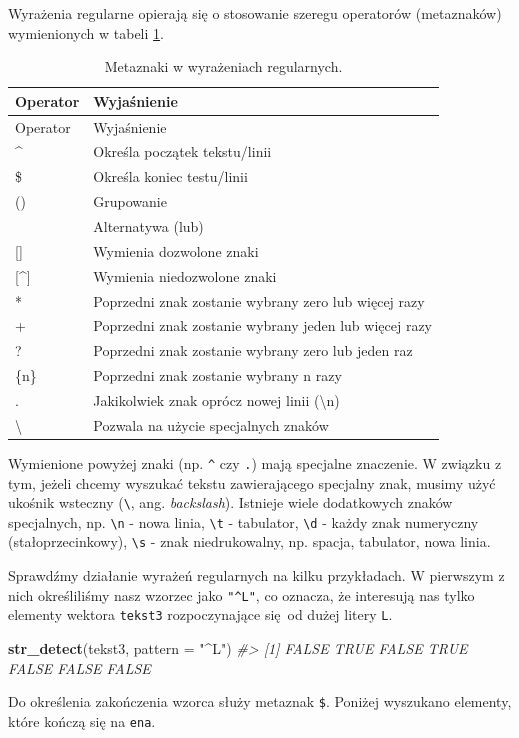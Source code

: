 \documentclass[paper=6in:9in,pagesize=pdftex,headinclude=on,footinclude=on,10pt]{scrbook}
\newenvironment{Shaded}{\begin{snugshade}}{\end{snugshade}}
\newcommand{\CommentTok}[1]{\textcolor[rgb]{0.56,0.35,0.01}{\textit{#1}}}
\newcommand{\DataTypeTok}[1]{\textcolor[rgb]{0.13,0.29,0.53}{#1}}
\newcommand{\KeywordTok}[1]{\textcolor[rgb]{0.13,0.29,0.53}{\textbf{#1}}}
\newcommand{\NormalTok}[1]{#1}
\newcommand{\StringTok}[1]{\textcolor[rgb]{0.31,0.60,0.02}{#1}}
\begin{document}
Wyrażenia regularne opierają się o stosowanie szeregu operatorów (metaznaków) wymienionych w tabeli \ref{tab:regexoperators}.

\begin{longtable}[]{@{}ll@{}}
\caption{\label{tab:regexoperators}Metaznaki w wyrażeniach regularnych.}\tabularnewline
\toprule
Operator & Wyjaśnienie\tabularnewline
\midrule
\endfirsthead
\toprule
Operator & Wyjaśnienie\tabularnewline
\midrule
\endhead
\^{} & Określa początek tekstu/linii\tabularnewline
\$ & Określa koniec testu/linii\tabularnewline
() & Grupowanie\tabularnewline
\textbar{} & Alternatywa (lub)\tabularnewline
{[}{]} & Wymienia dozwolone znaki\tabularnewline
{[}\^{}{]} & Wymienia niedozwolone znaki\tabularnewline
* & Poprzedni znak zostanie wybrany zero lub więcej razy\tabularnewline
+ & Poprzedni znak zostanie wybrany jeden lub więcej razy\tabularnewline
? & Poprzedni znak zostanie wybrany zero lub jeden raz\tabularnewline
\{n\} & Poprzedni znak zostanie wybrany n razy\tabularnewline
. & Jakikolwiek znak oprócz nowej linii (\textbackslash{}n)\tabularnewline
\textbackslash{} & Pozwala na użycie specjalnych znaków\tabularnewline
\bottomrule
\end{longtable}

Wymienione powyżej znaki (np. \texttt{\^{}} czy \texttt{.}) mają specjalne znaczenie.
W związku z tym, jeżeli chcemy wyszukać tekstu zawierającego specjalny znak, musimy użyć ukośnik wsteczny (\texttt{\textbackslash{}}, ang. \emph{backslash}).
Istnieje wiele dodatkowych znaków specjalnych, np. \texttt{\textbackslash{}n} - nowa linia, \texttt{\textbackslash{}t} - tabulator, \texttt{\textbackslash{}d} - każdy znak numeryczny (stałoprzecinkowy), \texttt{\textbackslash{}s} - znak niedrukowalny, np. spacja, tabulator, nowa linia.

Sprawdźmy działanie wyrażeń regularnych na kilku przykładach.
W pierwszym z nich określiliśmy nasz wzorzec jako \texttt{"\^{}L"}, co oznacza, że interesują nas tylko elementy wektora \texttt{tekst3} rozpoczynające się~od dużej litery \texttt{L}.

\begin{Shaded}
\begin{Highlighting}[]
\KeywordTok{str_detect}\NormalTok{(tekst3, }\DataTypeTok{pattern =} \StringTok{"^L"}\NormalTok{)}
\CommentTok{#> [1] FALSE  TRUE FALSE  TRUE FALSE FALSE FALSE}
\end{Highlighting}
\end{Shaded}

Do określenia zakończenia wzorca służy metaznak \texttt{\$}.
Poniżej wyszukano elementy, które kończą się na \texttt{ena}.
\end{document}
